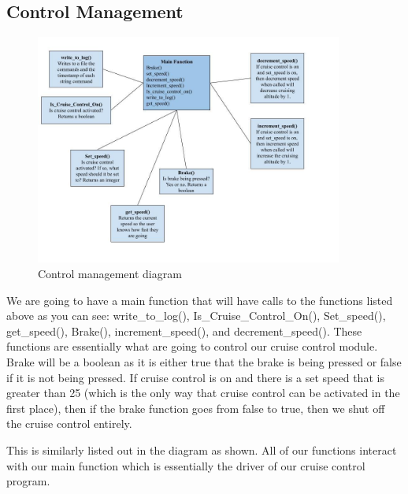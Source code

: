 \documentclass[preprint,11pt,3p]{article}
\begin{document}
\subsection{Control Management} 
	\begin{figure}[H]
		\includegraphics[width=0.9\textwidth]{images/Control_Management_Diagram.jpg}
		\caption{Control management diagram}
		\label{fig:control_mgmt_diagram}
	\end{figure}\par
	We are going to have a main function that will have calls to the functions listed above as you can see: write_to_log(), Is_Cruise_Control_On(), Set_speed(), get_speed(), Brake(), increment_speed(), and decrement_speed(). These functions are essentially what are going to control our cruise control module. Brake will be a boolean as it is either true that the brake is being pressed or false if it is not being pressed. If cruise control is on and there is a set speed that is greater than 25 (which is the only way that cruise control can be activated in the first place), then if the brake function goes from false to true, then we shut off the cruise control entirely. \par 
	This is similarly listed out in the diagram as shown. All of our functions interact with our main function which is essentially the driver of our cruise control program. 
\end{document}
